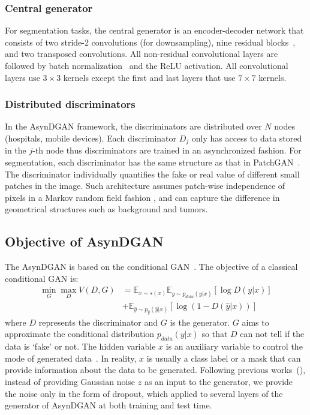 \subsubsection{Central generator}
For segmentation tasks, the central generator is an encoder-decoder network that consists of two stride-2 convolutions (for downsampling), nine residual blocks~\cite{he2016resnet}, and two transposed convolutions. All non-residual convolutional layers are followed by batch normalization~\cite{ioffe2015batch} and the ReLU activation. All convolutional layers use $3\times3$ kernels except the first and last layers that use $7\times7$ kernels.

\subsubsection{Distributed discriminators}
In the AsynDGAN framework, the discriminators are distributed over $N$ nodes (hospitals, mobile devices). Each discriminator $D_j$ only has access to data stored in the $j$-th node thus discriminators are trained in an asynchronized fashion. For segmentation, each discriminator has the same structure as that in PatchGAN~\cite{isola2016pix2pix}. The discriminator individually quantifies the fake or real value of different small patches in the image. Such architecture assumes patch-wise independence of pixels in a Markov random field fashion \cite{li2016precomputed,isola2017image}, and can capture the difference in geometrical structures such as background and tumors. 


\subsection{Objective of AsynDGAN}
The AsynDGAN is based on the conditional GAN~\cite{mirza2014conditiongan}. The objective of a classical conditional GAN is:
\begin{equation}
\begin{aligned}
\min\limits_{G}\max\limits_{D}V(D,G) &= \mathbb{E}_{x\sim s(x)}\mathbb{E}_{y\sim p_{data}(y|x)} [\log D(y|x)]\\
&+\mathbb{E}_{\hat{y}\sim p_{\hat{y}}(\hat{y}|x)} [\log(1-D(\hat{y}|x))]
\end{aligned}
\end{equation}
where $D$ represents the discriminator and $G$ is the generator. $G$ aims to approximate the conditional distribution $p_{data}(y|x)$ so that $D$ can not tell if the data is `fake' or not. The hidden variable $x$ is an auxiliary variable to control the mode of generated data~\cite{mirza2014conditiongan}. In reality, $x$ is usually a class label or a mask that can provide information about the data to be generated. Following previous works~(\cite{mathieu2015deep,isola2016pix2pix}), instead of providing Gaussian noise $z$ as an input to the generator, we provide the noise only in the form of dropout, which applied to several layers of the generator of AsynDGAN at both training and test time.

